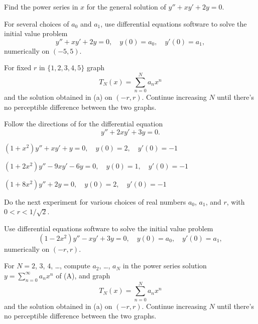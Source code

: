 \begin{exerciselist}
\item\label{exer:7.2.9}\Lex
\begin{alist}
\item %
Find the power series in $x$ for the general solution of
$y''+xy'+2y=0$.
\item %
For several choices of $a_0$ and $a_1$,
use  differential equations software to solve the initial
value problem
\[
y''+xy'+2y=0,\quad y(0)=a_0,\quad y'(0)=a_1,\tag{A}
\]
numerically on $(-5,5)$.
\item %
For fixed $r$ in $\{1,2,3,4,5\}$ graph
\[
T_N(x)=\sum_{n=0}^N a_nx^n
\]
and the solution obtained in (a) on $(-r,r)$.
Continue increasing $N$ until there's no perceptible
difference between the two graphs.
\end{alist}

\item\label{exer:7.2.10}\Lex
Follow the directions of   for the differential
equation
\[
y''+2xy'+3y=0.
\]


\item\label{exer:7.2.11}\Cex  $(1+x^2)y''+xy'+y=0,\quad y(0)=2,\quad
y'(0)=-1$
\item\label{exer:7.2.12}\Cex  $(1+2x^2)y''-9xy'-6y=0,\quad y(0)=1,\quad
y'(0)=-1$
\item\label{exer:7.2.13}\Cex  $(1+8x^2)y''+2y=0,\quad y(0)=2,\quad
y'(0)=-1$


\item\label{exer:7.2.14}\Lex
Do the next experiment for various choices of
real numbers  $a_0$, $a_1$, and $r$, with $0<r<1/\sqrt2$.
\begin{alist}
\item %
Use  differential equations software  to solve the initial
value problem
\[
(1-2x^2)y''-xy'+3y=0,\quad y(0)=a_0,\quad y'(0)=a_1,\tag{A}
\]
numerically on $(-r,r)$.
\item %
For $N=2$, $3$, $4$, \dots, compute $a_2$, \dots, $a_N$ in the power series
solution
$y=\sum_{n=0}^\infty a_nx^n$ of (A), and graph
\[
T_N(x)=\sum_{n=0}^N a_nx^n
\]
and the solution obtained in (a) on $(-r,r)$.
Continue increasing $N$ until there's no perceptible
difference between the two graphs.
\end{alist}


\end{exerciselist}
